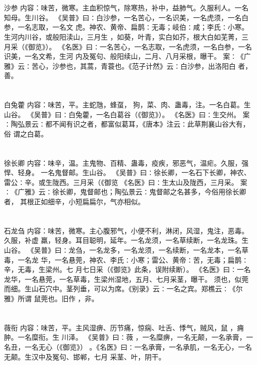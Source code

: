\documentclass[12pt,UTF8]{ctexbook}
\begin{document}
\section{}沙参
内容：味苦，微寒。主血积惊气，除寒热，补中，益肺气。久服利人。一名知母。生川谷。 
《吴普》曰∶白沙参，一名苦心，一名识美，一名虎须，一名白参，一名志取，一名文 
虎。神农、黄帝、扁鹊∶无毒；岐伯∶咸；李氏∶小寒。生河内川谷，或般阳渎山，三月生 
，如葵，叶青，实白如芥，根大白如芜菁，三月采（《御览》）。 
《名医》曰∶一名苦心，一名志取，一名虎须，一名白参，一名识美，一名文希，生河 
内及冤句、般阳续山，二月、八月采根，曝干。 
案∶《广雅》云∶苦心，沙参也，其蒿，青蓑也。《范子计然》云∶白沙参，出洛阳白 
者，善。 


\section{}白兔藿
内容：味苦，平。主蛇虺，蜂虿， 狗，菜、肉、蛊毒，注。一名白葛。生山谷。 
《吴普》曰∶白兔藿，一名白葛谷（《御览》）。 
《名医》曰∶生交州。 
案∶陶弘景云∶都不闻有识之者，都富似葛耳，《唐本》注云∶此草荆襄山谷大有，俗 
谓之白葛。 


\section{}徐长卿
内容：味辛，温。主鬼物、百精、蛊毒，疫疾，邪恶气，温疟。久服，强悍、轻身。 
一名鬼督邮。生山谷。 
《吴普》曰∶徐长卿，一名石下长卿，神农、雷公∶辛。或生陇西。三月采（《御览 
《名医》曰∶生太山及陇西，三月采。 
案∶《广雅》云∶徐长卿，鬼督邮也；陶弘景云∶鬼督邮之名甚多，今俗用徐长卿者， 
其根正如细辛，小短扁扁尔，气亦相似。 


\section{}石龙刍
内容：味苦，微寒。主心腹邪气，小便不利，淋闭，风湿，鬼注，恶毒。久服，补虚 
羸，轻身。耳目聪明，延年。一名龙须，一名草续断，一名龙珠。生山谷。 
《吴普》曰∶龙刍，一名龙多，一名龙须，一名续断，一名龙本，一名草毒，一名龙 
华，一名悬莞，神农、李氏∶小寒；雷公、黄帝∶苦，无毒；扁鹊∶辛，无毒，生梁州。七 
月七日采（《御览》此条，误附续断）。 
《名医》曰∶一名龙华，一名悬莞，一名草毒，生梁州湿地，五月、七月采茎，曝干。 
须也，似莞而细。生山石穴中。茎列垂，可以为席。《别录》云∶一名之宾。郑樵云∶《尔 
雅》所谓 鼠莞也。旧作 ，非。 


\section{}薇衔
内容：味苦，平。主风湿痹、历节痛，惊痫、吐舌、悸气，贼风，鼠 ，痈肿。一名糜衔。生 
川泽。 
《吴普》曰∶薇 ，一名糜痹，一名无颠，一名承膏，一名丑，一名无心（《御览》） 
。《名医》曰∶一名承膏，一名承肌，一名无心，一名无颠。生汉中及冤句、邯郸，七月 
采茎、叶，阴干。 
\end{document}
